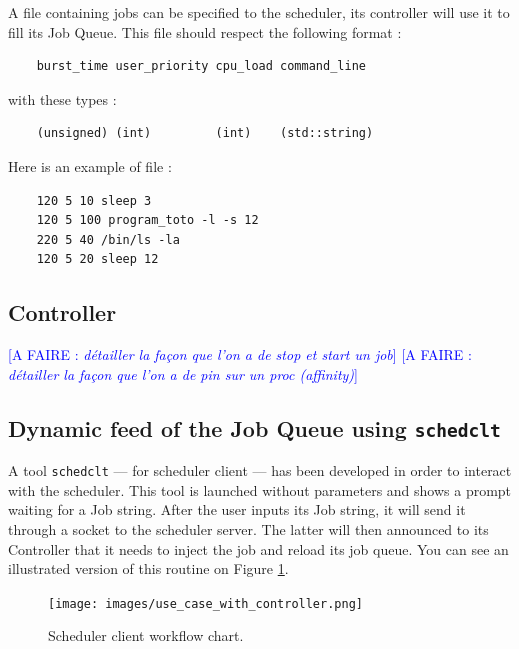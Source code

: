 \documentclass[a4paper,11pt]{article}
\newcommand*{\todo}[1]{\textcolor{blue}{[A FAIRE : \emph{#1}]}}
\begin{document}
A file containing jobs can be specified to the scheduler, its controller will use it to fill its Job Queue. This file should respect the following format :

\begin{verbatim}
    burst_time user_priority cpu_load command_line
\end{verbatim}

with these types :

\begin{verbatim}
    (unsigned) (int)         (int)    (std::string)
\end{verbatim}

Here is an example of file :

\begin{verbatim}
    120 5 10 sleep 3
    120 5 100 program_toto -l -s 12
    220 5 40 /bin/ls -la
    120 5 20 sleep 12
\end{verbatim}

\subsection{Controller}\label{job_controller}

\todo{détailler la façon que l'on a de stop et start un job}
\todo{détailler la façon que l'on a de pin sur un proc (affinity)}

\subsection{Dynamic feed of the Job Queue using \texttt{schedclt}}\label{schedclt_implementation}

A tool \texttt{schedclt} --- for scheduler client --- has been developed in order to interact with the scheduler. This tool is launched without parameters and shows a prompt waiting for a Job string. After the user inputs its Job string, it will send it through a socket to the scheduler server. The latter will then announced to its Controller that it needs to inject the job and reload its job queue. You can see an illustrated version of this routine on Figure \ref{schedclt_implementation_png}.

\begin{center}
\begin{figure}[ht]
\texttt{[image: images/use\_case\_with\_controller.png]}
\caption{Scheduler client workflow chart.}
\label{schedclt_implementation_png}
\end{figure}
\end{center}
\end{document}
